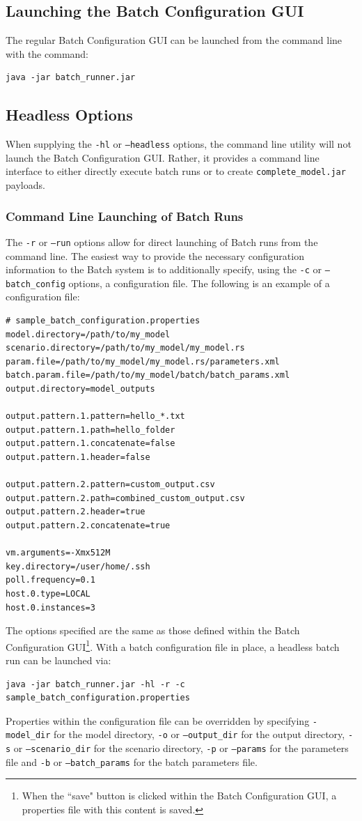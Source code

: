 \documentclass[11pt]{amsart}
\begin{document}
\subsection{Launching the Batch Configuration GUI}
The regular Batch Configuration GUI can be launched from the command line with the command:
\begin{verbatim}
java -jar batch_runner.jar
\end{verbatim}


\subsection{Headless Options}
When supplying the {\tt-hl} or {\tt--headless} options, the command line utility will not launch the Batch Configuration GUI. Rather, it provides a command line interface to either directly execute batch runs or to create  {\tt complete\_model.jar} payloads.
\subsubsection{Command Line Launching of Batch Runs}
The {\tt-r} or {\tt--run} options allow for direct launching of Batch runs from the command line. The easiest way to provide the necessary configuration information to the Batch system is to additionally specify, using the {\tt-c} or {\tt--batch\_config} options, a configuration file. The following is an example of a configuration file:
\begin{verbatim}
# sample_batch_configuration.properties
model.directory=/path/to/my_model
scenario.directory=/path/to/my_model/my_model.rs
param.file=/path/to/my_model/my_model.rs/parameters.xml
batch.param.file=/path/to/my_model/batch/batch_params.xml
output.directory=model_outputs

output.pattern.1.pattern=hello_*.txt
output.pattern.1.path=hello_folder
output.pattern.1.concatenate=false
output.pattern.1.header=false

output.pattern.2.pattern=custom_output.csv
output.pattern.2.path=combined_custom_output.csv
output.pattern.2.header=true
output.pattern.2.concatenate=true

vm.arguments=-Xmx512M
key.directory=/user/home/.ssh
poll.frequency=0.1
host.0.type=LOCAL
host.0.instances=3
\end{verbatim}

\noindent The options specified are the same as those defined within the Batch Configuration GUI\footnote{ When the ``save" button is clicked within the Batch Configuration GUI, a properties file with this content is saved.}. With a batch configuration file in place, a headless batch run can be launched via:
\begin{verbatim}
java -jar batch_runner.jar -hl -r -c sample_batch_configuration.properties
\end{verbatim}
Properties within the configuration file can be overridden by specifying {\tt-model\_dir} for the model directory, {\tt-o} or {\tt--output\_dir} for the output directory, {\tt-s} or {\tt--scenario\_dir} for the scenario directory, {\tt-p} or {\tt--params} for the parameters file and {\tt-b} or {\tt--batch\_params} for the batch parameters file.
\end{document}
